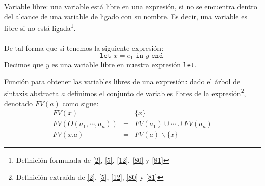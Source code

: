     \bigskip

    \begin{definition}Variable libre: una variable está libre en una expresión, si no se encuentra dentro del alcance de una variable de ligado con su nombre. Es decir, una variable es libre si no está ligada\footnote{Definición formulada de  \hyperlink{2}{[2]}, \hyperlink{5}{[5]}, \hyperlink{12}{[12]}, \hyperlink{80}{[80]} y \hyperlink{81}{[81]}}.\\\\
    De tal forma que si tenemos la siguiente expresión: \[ \texttt{let } x = e_1 \texttt{ in } y \texttt{ end } \] Decimos que $y$ es una variable libre en nuestra expresión \texttt{let}.
    \end{definition}

    \bigskip
    
    \begin{definition}Función para obtener las variables libres de una expresión: dado el árbol de sintaxis abstracta $a$  definimos el conjunto de variables libres de la expresión\footnote{Definición extraída de  \hyperlink{2}{[2]}, \hyperlink{5}{[5]}, \hyperlink{12}{[12]}, \hyperlink{80}{[80]} y \hyperlink{81}{[81]}}, denotado $FV(a)$ como sigue:
        \[
            \begin{array}{lcl}
                FV(x)&=&\{x\}\\
                FV(O(a_1,\cdots,a_n))&=&FV(a_1)\cup\cdots\cup FV(a_n)\\
                FV(x.a)&=&FV(a)\backslash\{x\}
            \end{array}
        \]
    \end{definition}

    \bigskip

